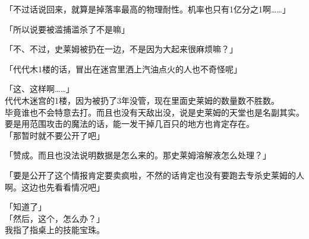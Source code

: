 「不过话说回来，就算是掉落率最高的物理耐性。机率也只有1亿分之1啊……」

「所以说要被滥捕滥杀了不是嘛」

「不、不过，史莱姆被扔在一边，不是因为大起来很麻烦嘛？」

「代代木1楼的话，冒出在迷宫里洒上汽油点火的人也不奇怪呢」

「这、这样啊……」\\

代代木迷宫的1楼，因为被扔了3年没管，现在里面史莱姆的数量数不胜数。\\

毕竟谁也不会特意去打。而且也没有天敌出没，说是史莱姆的天堂也是名副其实。要是用范围攻击的魔法的话，能一发干掉几百只的地方也肯定存在。\\

「那暂时就不要公开了吧」

「赞成。而且也没法说明数据是怎么来的。那史莱姆溶解液怎么处理？」

「要是公开了这个情报肯定要卖疯啦，不然的话肯定也没有要跑去专杀史莱姆的人啊。这边也先看看情况吧」

「知道了」\\

「然后，这个，怎么办？」\\

我指了指桌上的技能宝珠。\\

